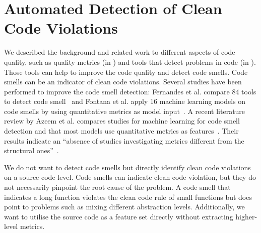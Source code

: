 \section{Automated Detection of Clean Code Violations}
We described the background and related work to different aspects of code quality, such as quality metrics (in ) and tools that detect problems in code (in ). Those tools can help to improve the code quality and detect code smells. Code smells can be an indicator of clean code violations. Several studies have been performed to improve the code smell detection: Fernandes et al. compare 84 tools to detect code smell~\cite{fernandes_review-based_2016} and Fontana et al. apply 16 machine learning models on code smells by using quantitative metrics as model input~\cite{arcelli_fontana_comparing_2016}. A recent literature review by Azeem et al. compares studies for machine learning for code smell detection and that most models use quantitative metrics as features~\cite{azeem_machine_2019}. Their results indicate an \enquote{absence of studies investigating metrics different from the structural
ones}~\cite{azeem_machine_2019}.

We do not want to detect code smells but directly identify clean code violations on a source code level. Code smells can indicate clean code violation, but they do not necessarily pinpoint the root cause of the problem. A code smell that indicates a long function violates the clean code rule of small functions but does point to problems such as mixing different abstraction levels. Additionally, we want to utilise the source code as a feature set directly without extracting higher-level metrics.